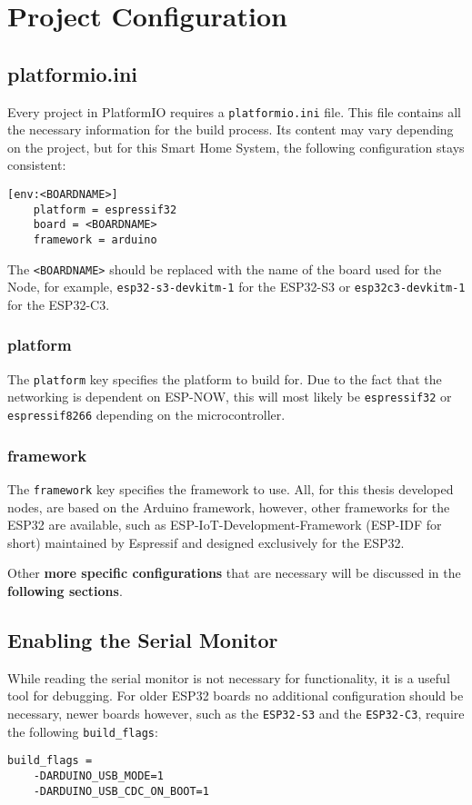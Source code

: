 \section{Project Configuration}

    \subsection{platformio.ini}
    Every project in PlatformIO requires a \texttt{platformio.ini} file. This file
    contains all the necessary information for the build process. Its content may
    vary depending on the project, but for this Smart Home System, the following
    configuration stays consistent:

    \begin{verbatim}
[env:<BOARDNAME>]
    platform = espressif32
    board = <BOARDNAME>
    framework = arduino
    \end{verbatim}
    
    The \texttt{<BOARDNAME>} should be replaced with the name of the board used
    for the Node, for example, \texttt{esp32-s3-devkitm-1} for the ESP32-S3 or
    \texttt{esp32c3-devkitm-1} for the ESP32-C3.

        \subsubsection{platform}
        The \texttt{platform} key specifies the platform to build for. Due to the
        fact that the networking is dependent on ESP-NOW, this will most likely be
        \texttt{espressif32} or \texttt{espressif8266} depending on the 
        microcontroller.
        
        \subsubsection{framework}
        The \texttt{framework} key specifies the framework to use. All, for this 
        thesis developed nodes, are based on the Arduino framework, however, other
        frameworks for the ESP32 are available, such as ESP-IoT-Development-Framework
        (ESP-IDF for short) maintained by Espressif and designed exclusively for the 
        ESP32.
        
        Other \textbf{more specific 
        configurations} that are necessary will be discussed in the \textbf{following 
        sections}.

    \subsection{Enabling the Serial Monitor}
    While reading the serial monitor is not necessary for functionality, it is a
    useful tool for debugging. For older ESP32 boards no additional configuration 
    should be necessary, newer boards however, such as the \texttt{ESP32-S3} and the 
    \texttt{ESP32-C3}, require the following \texttt{build\_flags}: 
    \begin{verbatim}
build_flags =
    -DARDUINO_USB_MODE=1
    -DARDUINO_USB_CDC_ON_BOOT=1
    \end{verbatim}
    

